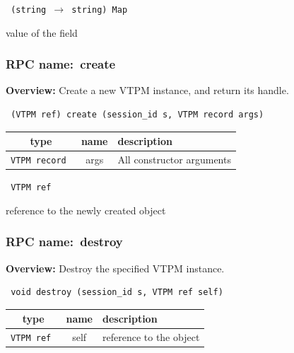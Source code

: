 \vspace{0.3cm}

{\tt
(string $\rightarrow$ string) Map
}


value of the field
\vspace{0.3cm}
\vspace{0.3cm}
\vspace{0.3cm}
\subsubsection{RPC name:~create}

{\bf Overview:} 
Create a new VTPM instance, and return its handle.

\begin{verbatim} (VTPM ref) create (session_id s, VTPM record args)\end{verbatim}



 
\vspace{0.3cm}
\begin{tabular}{|c|c|p{7cm}|}
 \hline
{\bf type} & {\bf name} & {\bf description} \\ \hline
{\tt VTPM record } & args & All constructor arguments \\ \hline 

\end{tabular}

\vspace{0.3cm}

{\tt 
VTPM ref
}


reference to the newly created object
\vspace{0.3cm}
\vspace{0.3cm}
\vspace{0.3cm}
\subsubsection{RPC name:~destroy}

{\bf Overview:} 
Destroy the specified VTPM instance.

\begin{verbatim} void destroy (session_id s, VTPM ref self)\end{verbatim}



 
\vspace{0.3cm}
\begin{tabular}{|c|c|p{7cm}|}
 \hline
{\bf type} & {\bf name} & {\bf description} \\ \hline
{\tt VTPM ref } & self & reference to the object \\ \hline 

\end{tabular}

